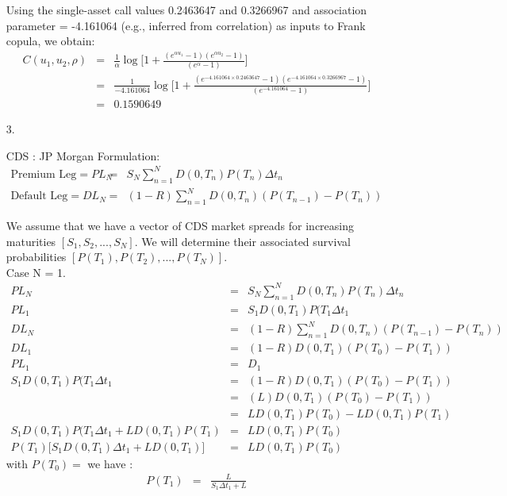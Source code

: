 \documentclass[11pt,oneside,a4paper, titlepage]{article}
\begin{document}
\begin{enumerate}
Using the single-asset call values 0.2463647 and 0.3266967 and association parameter = -4.161064 (e.g., inferred from
correlation) as inputs to Frank copula, we obtain:
\begin{eqnarray*}
	C(u_1, u_2, \rho) &=& \frac{1}{\alpha} \log\bigg[1+\frac{(e^{\alpha u_1}-1)(e^{\alpha u_2}-1)}{(e^{\alpha}-1)}\bigg] \\
					  &=& \frac{1}{-4.161064} \log\bigg[1+\frac{(e^{-4.161064\times 0.2463647}-1)(e^{-4.161064\times 0.3266967}-1)}{(e^{-4.161064}-1)}\bigg] \\
					  &=& 0.1590649
\end{eqnarray*}


\item[3.] 

CDS : JP Morgan Formulation:
\begin{eqnarray*}
	\text{Premium Leg} = PL_N &=& S_N \sum_{n=1}^{N} D(0, T_n) P(T_n) \Delta t_n\\
	\text{Default Leg} = DL_N &=& (1-R) \sum_{n=1}^{N} D(0, T_n) (P(T_{n-1})- P(T_n))
\end{eqnarray*}

We assume that we have a vector of CDS market spreads for increasing maturities \([S_1,S_2,...,S_N]\). We will determine their associated survival probabilities \([P(T_1),P(T_2),...,P(T_N)]\).\\

Case N = 1.
\begin{eqnarray*}
	PL_N &=& S_N \sum_{n=1}^{N} D(0, T_n) P(T_n) \Delta t_n\\
	PL_1 &=& S_1 D(0, T_1) P(T_1 \Delta t_1 \\
	DL_N &=& (1-R) \sum_{n=1}^{N} D(0, T_n) (P(T_{n-1})- P(T_n)) \\
	DL_1 &=& (1-R) D(0, T_1) (P(T_0)- P(T_1)) \\
	PL_1 &=& D_1 \\
	S_1 D(0, T_1) P(T_1 \Delta t_1 &=& (1-R) D(0, T_1) (P(T_0)- P(T_1))\\
								   &=& (L) D(0, T_1) (P(T_0)- P(T_1)) \\
								   &=& L D(0, T_1) P(T_0)- L D(0, T_1)P(T_1) \\
	S_1 D(0, T_1) P(T_1 \Delta t_1 + L D(0, T_1)P(T_1) &=& L D(0, T_1) P(T_0) \\
	P(T_1) \big[S_1D(0, T_1) \Delta t_1 + L D(0, T_1)\big] &=& LD(0,T_1) P(T_0)
\end{eqnarray*}
with \(P(T_0)=\) we have :
\begin{eqnarray*}
	P(T_1) &=& \frac{L}{S_1\Delta t_1 + L}
\end{eqnarray*}


\end{enumerate}
\end{document}
